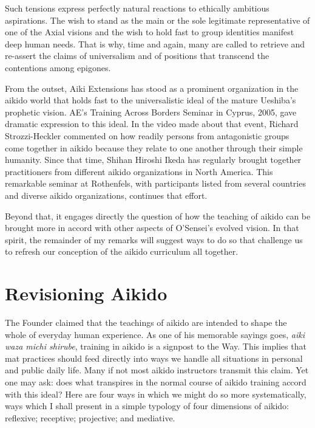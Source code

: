 Such tensions express perfectly natural reactions to ethically ambitious aspirations. The wish to stand as the main or the sole legitimate representative of one of the Axial visions and the wish to hold fast to group identities manifest deep human needs. That is why, time and again, many are called to retrieve and re-assert the claims of universalism and of positions that transcend the contentions among epigones. 

From the outset, Aiki Extensions has stood as a prominent organization in the aikido world that holds fast to the universalistic ideal of the mature Ueshiba's prophetic vision. AE's Training Across Borders Seminar in Cyprus, 2005, gave dramatic expression to this ideal. In the video made about that event, Richard Strozzi-Heckler commented on how readily persons from antagonistic groups come together in aikido because they relate to one another through their simple humanity. Since that time, Shihan Hiroshi Ikeda has regularly brought together practitioners from different aikido organizations in North America. This remarkable seminar at Rothenfels, with participants listed from several countries and diverse aikido organizations, continues that effort. 

Beyond that, it engages directly the question of how the teaching of aikido can be brought more in accord with other aspects of O'Sensei's evolved vision. In that spirit, the remainder of my remarks will suggest ways to do so that challenge us to refresh our conception of the aikido curriculum all together.

\section*{Revisioning Aikido}

The Founder claimed that the teachings of aikido are intended to shape the whole of everyday human experience. As one of his memorable sayings goes, \emph{aiki waza michi shirube}, training in aikido is a signpost to the Way. This implies that mat practices should feed directly into ways we handle all situations in personal and public daily life. Many if not most aikido instructors transmit this claim. Yet one may ask: does what transpires in the normal course of aikido training accord with this ideal? Here are four ways in which we might do so more systematically, ways which I shall present in a simple typology of four dimensions of aikido: reflexive; receptive; projective; and mediative.

